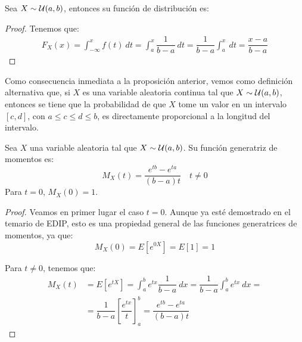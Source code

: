 \begin{prop}
    Sea $X\sim \mathcal{U}(a,b)$, entonces su función de distribución es:
\end{prop}
\begin{proof}
    Tenemos que:
    \begin{align*}
        F_X(x) = \int_{-\infty}^x f(t)~dt
        = \int_{a}^{x} \dfrac{1}{b-a}~dt
        = \dfrac{1}{b-a} \int_a^x ~dt
        = \dfrac{x-a}{b-a}
    \end{align*}
\end{proof}

Como consecuencia inmediata a la proposición anterior, vemos como definición alternativa
que, si $X$ es una variable aleatoria continua tal que $X\sim \mathcal{U}(a,b)$, entonces se tiene que
la probabilidad de que $X$ tome un valor en un intervalo $[c,d]$, con $a\leq c\leq d\leq b$, es
directamente proporcional a la longitud del intervalo.

\begin{prop}
    Sea $X$ una variable aleatoria tal que $X\sim \mathcal{U}(a,b)$. Su función generatriz de momentos es:
    \begin{equation*}
        M_X(t) = \dfrac{e^{tb} - e^{ta}}{(b-a)t} \quad t\neq 0
    \end{equation*}
    Para $t=0$, $M_X(0) = 1$.
\end{prop}
\begin{proof}
    Veamos en primer lugar el caso $t=0$. Aunque ya esté demostrado en el temario de EDIP, esto es una propiedad
    general de las funciones generatrices de momentos, ya que:
    \begin{equation*}
        M_X(0) = E\left[e^{0X}\right] = E[1] = 1
    \end{equation*}

    Para $t\neq 0$, tenemos que:
    \begin{align*}
        M_X(t) &= E\left[e^{tX}\right] = \int_{a}^{b} e^{tx} \dfrac{1}{b-a}~dx = \dfrac{1}{b-a} \int_{a}^{b} e^{tx}~dx =\\
        &= \dfrac{1}{b-a} \left[ \dfrac{e^{tx}}{t} \right]_{a}^{b} = \dfrac{e^{tb} - e^{ta}}{(b-a)t}
    \end{align*}
\end{proof}

